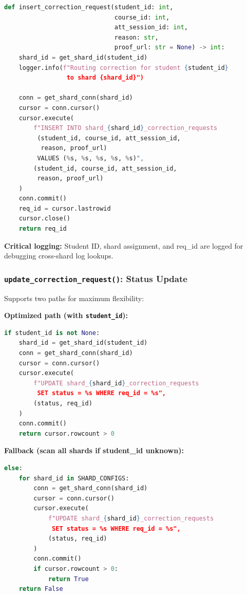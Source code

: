 \documentclass[conference]{IEEEtran}
\begin{document}
\begin{lstlisting}[language=Python]
def insert_correction_request(student_id: int, 
                              course_id: int, 
                              att_session_id: int,
                              reason: str, 
                              proof_url: str = None) -> int:
    shard_id = get_shard_id(student_id)
    logger.info(f"Routing correction for student {student_id} 
                 to shard {shard_id}")
    
    conn = get_shard_conn(shard_id)
    cursor = conn.cursor()
    cursor.execute(
        f"INSERT INTO shard_{shard_id}_correction_requests 
         (student_id, course_id, att_session_id, 
          reason, proof_url) 
         VALUES (%s, %s, %s, %s, %s)",
        (student_id, course_id, att_session_id, 
         reason, proof_url)
    )
    conn.commit()
    req_id = cursor.lastrowid
    cursor.close()
    return req_id
\end{lstlisting}

\textbf{Critical logging:} Student ID, shard assignment, and req\_id are logged for debugging cross-shard log lookups.

\subsubsection{\texttt{update\_correction\_request()}: Status Update}

Supports two paths for maximum flexibility:

\textbf{Optimized path (with \texttt{student\_id}):}
\begin{lstlisting}[language=Python]
if student_id is not None:
    shard_id = get_shard_id(student_id)
    conn = get_shard_conn(shard_id)
    cursor = conn.cursor()
    cursor.execute(
        f"UPDATE shard_{shard_id}_correction_requests 
         SET status = %s WHERE req_id = %s",
        (status, req_id)
    )
    conn.commit()
    return cursor.rowcount > 0
\end{lstlisting}

\textbf{Fallback (scan all shards if student\_id unknown):}
\begin{lstlisting}[language=Python]
else:
    for shard_id in SHARD_CONFIGS:
        conn = get_shard_conn(shard_id)
        cursor = conn.cursor()
        cursor.execute(
            f"UPDATE shard_{shard_id}_correction_requests 
             SET status = %s WHERE req_id = %s",
            (status, req_id)
        )
        conn.commit()
        if cursor.rowcount > 0:
            return True
    return False
\end{lstlisting}
\end{document}
